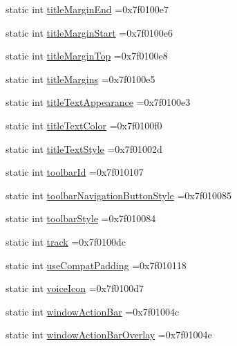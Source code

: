 \begin{DoxyCompactItemize}
static int \hyperlink{classandroid_1_1support_1_1design_1_1R_1_1attr_a6f4a4d32dd0149d89489859570ae1e40}{title\+Margin\+End} =0x7f0100e7
\item 
static int \hyperlink{classandroid_1_1support_1_1design_1_1R_1_1attr_aadfb6a3ca430a7444ffb6de0d2c8c5d9}{title\+Margin\+Start} =0x7f0100e6
\item 
static int \hyperlink{classandroid_1_1support_1_1design_1_1R_1_1attr_a3e498d603752368ce0e9f7455c87f6cb}{title\+Margin\+Top} =0x7f0100e8
\item 
static int \hyperlink{classandroid_1_1support_1_1design_1_1R_1_1attr_a62098fcd5729333af2c4347b968ab03a}{title\+Margins} =0x7f0100e5
\item 
static int \hyperlink{classandroid_1_1support_1_1design_1_1R_1_1attr_ad430580335b0f55e7508d87c4a68b4d8}{title\+Text\+Appearance} =0x7f0100e3
\item 
static int \hyperlink{classandroid_1_1support_1_1design_1_1R_1_1attr_a08459d5006ee4c06955351a45afbcbf0}{title\+Text\+Color} =0x7f0100f0
\item 
static int \hyperlink{classandroid_1_1support_1_1design_1_1R_1_1attr_a826c283648de1009c659c577c61a5f2f}{title\+Text\+Style} =0x7f01002d
\item 
static int \hyperlink{classandroid_1_1support_1_1design_1_1R_1_1attr_aac914fc3be1f5e694bde0127bf5f719b}{toolbar\+Id} =0x7f010107
\item 
static int \hyperlink{classandroid_1_1support_1_1design_1_1R_1_1attr_a4a1cd4185adacb795ddeeb79bf2f84aa}{toolbar\+Navigation\+Button\+Style} =0x7f010085
\item 
static int \hyperlink{classandroid_1_1support_1_1design_1_1R_1_1attr_a75b98851c40a539d3c8cba7e8429a3e4}{toolbar\+Style} =0x7f010084
\item 
static int \hyperlink{classandroid_1_1support_1_1design_1_1R_1_1attr_ad467d29a4423787673806b6d2ec0a48e}{track} =0x7f0100dc
\item 
static int \hyperlink{classandroid_1_1support_1_1design_1_1R_1_1attr_ae9972f9c82bd89aa3af6cc62b3939ecd}{use\+Compat\+Padding} =0x7f010118
\item 
static int \hyperlink{classandroid_1_1support_1_1design_1_1R_1_1attr_a52019590c44e770bbcf3702f5e7af367}{voice\+Icon} =0x7f0100d7
\item 
static int \hyperlink{classandroid_1_1support_1_1design_1_1R_1_1attr_ad115fed13b20f5c7c7be738211784448}{window\+Action\+Bar} =0x7f01004c
\item 
static int \hyperlink{classandroid_1_1support_1_1design_1_1R_1_1attr_a2dd003742e176a3aca66a2d4064b7bab}{window\+Action\+Bar\+Overlay} =0x7f01004e

\end{DoxyCompactItemize}
